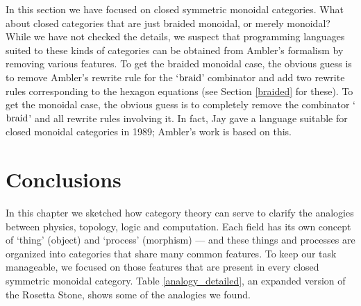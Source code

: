 \documentclass[12pt,twoside,openright]{report}
\newcommand{\braid}{{\rm braid}}
\begin{document}
In this section we have focused on closed symmetric monoidal categories.  What about closed categories that are just braided monoidal, or merely monoidal?  While we have not checked the details, we suspect that programming languages suited to these kinds of categories can be obtained from Ambler's formalism by removing various features.  To get the braided monoidal case, the obvious guess is to remove Ambler's rewrite rule for the `$\braid$' combinator and add two rewrite rules corresponding to the hexagon equations (see Section \ref{braided} for these).  To get the monoidal case, the obvious guess is to completely remove the combinator `$\braid$' and all rewrite rules involving it.  In fact, Jay \cite{Jay1989} gave a language suitable for closed monoidal categories in 1989; Ambler's work is based on this.  

\section{Conclusions}
\label{conclusions}

In this chapter we sketched how category theory can serve to clarify the analogies between physics, topology, logic and computation.  Each field has its own concept of `thing' (object) and `process' (morphism)
--- and these things and processes are organized into categories that share many common features.  To keep our task manageable, we focused on those features that are present in every closed symmetric monoidal category.  Table \ref{analogy_detailed}, an expanded version of the Rosetta Stone, shows some of the analogies we found.
\end{document}
